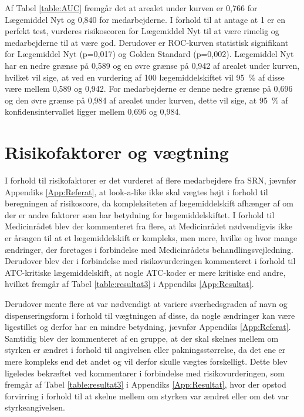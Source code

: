 Af Tabel \ref{table:AUC} fremgår det at arealet under kurven er 0,766 for Lægemiddel Nyt og 0,840 for medarbejderne. I forhold til at antage at 1 er en perfekt test, vurderes risikoscoren for Lægemiddel Nyt til at være rimelig og medarbejderne til at være god. Derudover er ROC-kurven statistisk signifikant for Lægemiddel Nyt (p=0,017) og Golden Standard (p=0,002). Lægemiddel Nyt har en nedre grænse på 0,589 og en øvre grænse på 0,942 af arealet under kurven, hvilket vil sige, at ved en vurdering af 100 lægemiddelskiftet vil 95~\% af disse være mellem 0,589 og 0,942. For medarbejderne er denne nedre grænse på 0,696 og den øvre grænse på 0,984 af arealet under kurven, dette vil sige, at 95~\% af konfidensintervallet ligger mellem 0,696 og 0,984.

\section{Risikofaktorer og vægtning}
I forhold til risikofaktorer er det vurderet af flere medarbejdere fra SRN, jævnfør Appendiks 
\ref{App:Referat}, at look-a-like ikke skal vægtes højt i forhold til beregningen af risikoscore, da kompleksiteten af lægemiddelskift afhænger af om der er andre faktorer som har betydning for lægemiddelskiftet. I forhold til Medicinrådet blev der kommenteret fra flere, at Medicinrådet nødvendigvis ikke er årsagen til at et lægemiddelskift er kompleks, men mere, hvilke og hvor mange ændringer, der foretages i forbindelse med Medicinrådets behandlingsvejledning. Derudover blev der i forbindelse med risikovurderingen kommenteret i forhold til ATC-kritiske lægemiddelskift, at nogle ATC-koder er mere kritiske end andre, hvilket fremgår af Tabel \ref{table:resultat3} i Appendiks \ref{App:Resultat}. 

Derudover mente flere at var nødvendigt at variere sværhedsgraden af navn og dispenseringsform i forhold til vægtningen af disse, da nogle ændringer kan være ligestillet og derfor har en mindre betydning, jævnfør Appendiks \ref{App:Referat}. Samtidig blev der kommenteret af en gruppe, at der skal skelnes mellem om styrken er ændret i forhold til angivelsen eller pakningsstørrelse, da det ene er mere kompleks end det andet og vil derfor skulle vægtes forskelligt. Dette blev ligeledes bekræftet ved kommentarer i forbindelse med risikovurderingen, som fremgår af Tabel \ref{table:resultat3} i Appendiks \ref{App:Resultat}, hvor der opstod forvirring i forhold til at skelne mellem om styrken var ændret eller om det var styrkeangivelsen.




